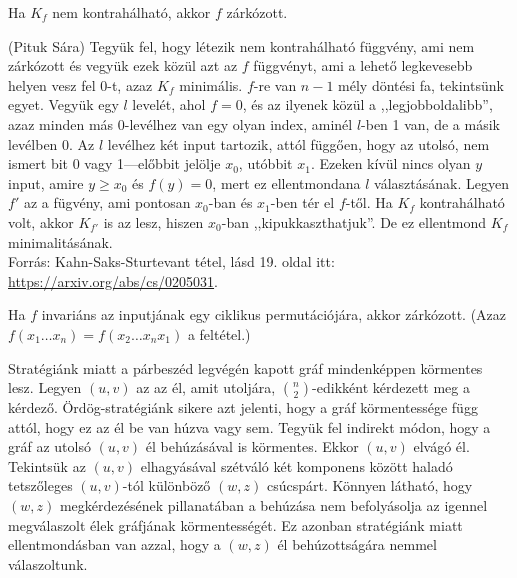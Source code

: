 \begin{Exercise}[counter={sorszam}, difficulty=0]
	Ha $K_f$ nem kontrah\'alhat\'o, akkor $f$ zárkózott.
\end{Exercise}
\begin{Answer}
	(Pituk S\'ara) Tegy\"uk fel, hogy l\'etezik nem kontrah\'alhat\'o f\"uggv\'eny, ami nem z\'ark\'ozott \'es vegy\"uk ezek k\"oz\"ul azt az $f$ f\"uggv\'enyt, ami a lehet\H o legkevesebb helyen vesz fel 0-t, azaz $K_f$ minim\'alis.	
	$f$-re van $n-1$ m\'ely d\"ont\'esi fa, tekints\"unk egyet.
	Vegy\"uk egy $l$ level\'et, ahol $f=0$, \'es az ilyenek k\"oz\"ul a ,,legjobboldalibb'', azaz minden m\'as 0-lev\'elhez van egy olyan index, amin\'el $l$-ben 1 van, de a m\'asik lev\'elben 0.
	Az $l$ lev\'elhez k\'et input tartozik, att\'ol f\"ugg\H oen, hogy az utols\'o, nem ismert bit 0 vagy 1---el\H obbit jel\"olje $x_0$, ut\'obbit $x_1$.
	Ezeken k\'iv\"ul nincs olyan $y$ input, amire $y\ge x_0$ \'es $f(y)=0$, mert ez ellentmondana $l$ v\'alaszt\'as\'anak.
	Legyen $f'$ az a f\"ugv\'eny, ami pontosan $x_0$-ban \'es $x_1$-ben t\'er el $f$-t\H ol.
	Ha $K_f$ kontrah\'alhat\'o volt, akkor $K_{f'}$ is az lesz, hiszen $x_0$-ban ,,kipukkaszthatjuk''.
	De ez ellentmond $K_f$ minimalit\'as\'anak.\\
	Forr\'as: Kahn-Saks-Sturtevant t\'etel, l\'asd 19. oldal itt: \url{https://arxiv.org/abs/cs/0205031}.
\end{Answer}

\begin{Exercise}[counter={sorszam}, difficulty=1]
	Ha $f$ invari\'ans az inputj\'anak egy ciklikus permut\'aci\'oj\'ara, akkor z\'ark\'ozott. (Azaz $f(x_1\ldots x_n)=f(x_2\ldots x_nx_1)$ a felt\'etel.)
\end{Exercise}


\begin{Answer}
	 Stratégiánk miatt a párbeszéd legvégén kapott gráf mindenképpen körmentes lesz. Legyen $(u,v)$ az az él, amit utoljára, $\binom{n}{2}$-edikként  kérdezett meg a kérdező. Ördög-stratégiánk sikere azt jelenti, hogy a gráf körmentessége függ attól, hogy ez az él be van húzva vagy sem. Tegyük fel indirekt módon, hogy a gráf az utolsó $(u,v)$ él behúzásával is körmentes. Ekkor $(u,v)$ elvágó él. Tekintsük az $(u,v)$ elhagyásával szétváló két komponens között haladó tetszőleges $(u,v)$-tól különböző $(w,z)$ csúcspárt.  Könnyen látható, hogy $(w,z)$ megkérdezésének pillanatában a behúzása nem befolyásolja az igennel megválaszolt élek gráfjának körmentességét. Ez azonban stratégiánk miatt ellentmondásban van azzal, hogy a $(w,z)$ él behúzottságára nemmel válaszoltunk.
\end{Answer}













